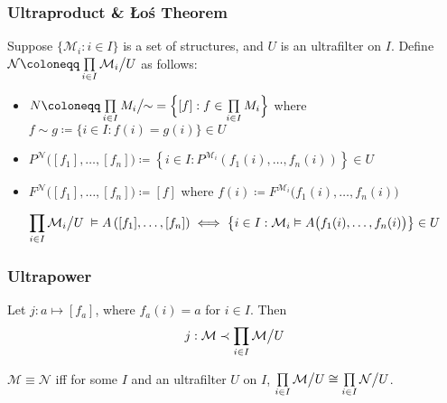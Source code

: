 \documentclass[UTF8,aspectratio=43,11pt,colorlinks,compress,openany]{beamer}%
\begin{document}
\begin{frame}\frametitle{Ultraproduct \& \L o\'s Theorem}
\setlength\abovedisplayskip{0pt}
\setlength\belowdisplayskip{0pt}
	\begin{definition}[Ultraproduct]
		Suppose $\{\mathcal{M}_i: i\in I\}$ is a set of structures, and $U$ is an ultrafilter on $I$. Define $\mathcal{N}\coloneqq \prod\limits_{i\in I}\mathcal{M}_i\big\slash U$ as follows:
		\begin{itemize}
			\item $N\coloneqq \prod\limits_{i\in I}M_i\big\slash\!\!\sim \;=\Big\{[f]: f\in\prod\limits_{i\in I} M_i\Big\}$ where $f\sim g\coloneqq \big\{i\in I: f(i)=g(i)\big\}\in U$
			\item $P^{\mathcal{N}}\big([f_1],\dots,[f_n]\big)\coloneqq \left\{i\in I: P^{\mathcal{M}_i}(f_1(i),\dots,f_n(i))\right\}\in U$
			\item $F^{\mathcal{N}}\big([f_1],\dots,[f_n]\big)\coloneqq [f]$ where $f(i)\coloneqq F^{\mathcal{M}_i}\big(f_1(i),\dots,f_n(i)\big)$
		\end{itemize}
	\end{definition}
	\begin{theorem}[\L o\'s Theorem]
		\[\prod\limits_{i\in I}\mathcal{M}_i\big\slash U\;\vDash A\left([f_1],\dots,[f_n]\right)\iff\left\{i\in I:\mathcal{M}_i\vDash A\big(f_1(i),\dots,f_n(i)\big)\right\}\in U\]
	\end{theorem}
\end{frame}

\begin{frame}\frametitle{Ultrapower}
	\begin{block}{}
	Let $j: a\mapsto[f_a]$, where $f_a(i)=a$ for $i\in I$. Then
	\[j:\mathcal{M}\prec\prod\limits_{i\in I}\mathcal{M}\big\slash U\]
	\end{block}
	\begin{theorem}
	$\mathcal{M}\equiv\mathcal{N}$ iff for some $I$ and an ultrafilter $U$ on $I$, $\prod\limits_{i\in I}\mathcal{M}\big\slash U\cong\prod\limits_{i\in I}\mathcal{N}\big\slash U$.
	\end{theorem}
\end{frame}
\end{document}

